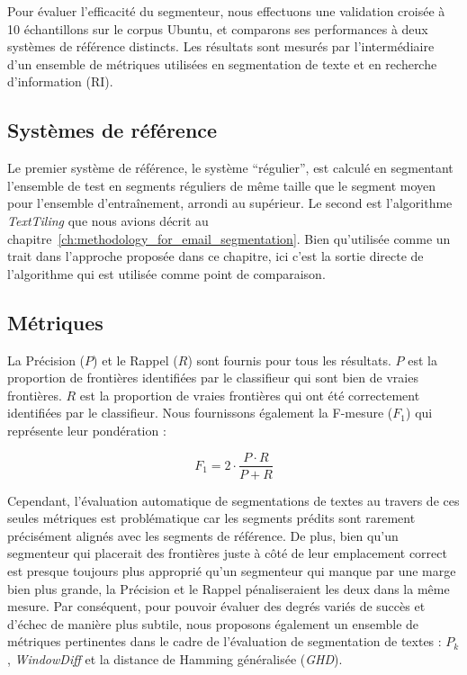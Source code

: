 Pour évaluer l'efficacité du segmenteur, nous effectuons une validation croisée à 10 échantillons sur le corpus Ubuntu, et comparons ses performances à deux systèmes de référence distincts. Les résultats sont mesurés par l'intermédiaire d'un ensemble de métriques utilisées en segmentation de texte et en recherche d'information (RI).

\subsection{Systèmes de référence}

Le premier système de référence, le système ``régulier'', est calculé en segmentant l'ensemble de test en segments réguliers de même taille que le segment moyen pour l'ensemble d'entraînement, arrondi au supérieur. Le second est l'algorithme \textit{TextTiling} que nous avions décrit au chapitre~\ref{ch:methodology_for_email_segmentation}. Bien qu'utilisée comme un trait dans l'approche proposée dans ce chapitre, ici c'est la sortie directe de l'algorithme qui est utilisée comme point de comparaison.

\subsection{Métriques}

La Précision ($P$) et le Rappel ($R$) sont fournis pour tous les résultats. $P$ est la proportion de frontières identifiées par le classifieur qui sont bien de vraies frontières. $R$ est la proportion de vraies frontières qui ont été correctement identifiées par le classifieur. Nous fournissons également la F-mesure ($F_1$) qui représente leur pondération :

\[
F_1 = 2 \cdot \frac{P \cdot R}{P + R}
\]

Cependant, l'évaluation automatique de segmentations de textes au travers de ces seules métriques est problématique car les segments prédits sont rarement précisément alignés avec les segments de référence. De plus, bien qu'un segmenteur qui placerait des frontières juste à côté de leur emplacement correct est presque toujours plus approprié qu'un segmenteur qui manque par une marge bien plus grande, la Précision et le Rappel pénaliseraient les deux dans la même mesure. Par conséquent, pour pouvoir évaluer des degrés variés de succès et d'échec de manière plus subtile, nous proposons également un ensemble de métriques pertinentes dans le cadre de l'évaluation de segmentation de textes : ${P_{k}}$, \textit{WindowDiff} et la distance de Hamming généralisée (\textit{GHD}).

